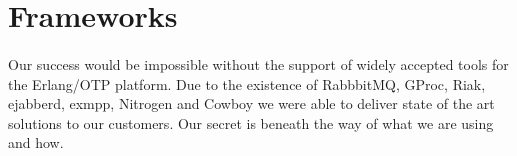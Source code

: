 \documentclass[11pt]{article}
\begin{document}


\section*{Frameworks}
\paragraph{}
Our success would be impossible without the support of widely accepted tools for the Erlang/OTP platform.
Due to the existence of RabbbitMQ, GProc, Riak, ejabberd, exmpp, Nitrogen and
Cowboy we were able to deliver state of the art solutions to our customers. 
Our secret is beneath the way of what we are using and how.



\end{document}
